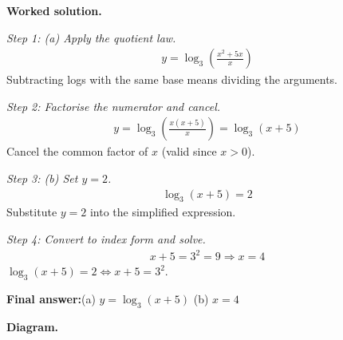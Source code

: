 \documentclass[11pt]{article}
\begin{document}
\textbf{Worked solution.}

\textit{Step 1: (a) Apply the quotient law.}
\[\begin{gathered}
y = \log_3\!\left(\frac{x^2+5x}{x}\right)
\end{gathered}\]
Subtracting logs with the same base means dividing the arguments.

\textit{Step 2: Factorise the numerator and cancel.}
\[\begin{gathered}
y = \log_3\!\left(\frac{x(x+5)}{x}\right) = \log_3(x+5)
\end{gathered}\]
Cancel the common factor of \( x \) (valid since \( x > 0 \)).

\textit{Step 3: (b) Set \( y = 2 \).}
\[\begin{gathered}
\log_3(x+5) = 2
\end{gathered}\]
Substitute \( y = 2 \) into the simplified expression.

\textit{Step 4: Convert to index form and solve.}
\[\begin{gathered}
x + 5 = 3^2 = 9 \Rightarrow x = 4
\end{gathered}\]
\( \log_3(x+5) = 2 \Leftrightarrow x+5 = 3^2 \).

\begin{answerbox}
\textbf{Final answer:}\quad (a) \(\displaystyle  y = \log_3(x+5) \) \quad  (b) \(\displaystyle  x = 4 \)
\end{answerbox}
\textbf{Diagram.}
\end{document}

